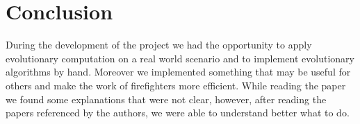\section{Conclusion}
During the development of the project we had the opportunity to apply evolutionary computation on a real world scenario 
and to implement evolutionary algorithms by hand. Moreover we implemented something that may be useful for others and make the work
of firefighters more efficient.
While reading the paper we found some explanations that were not clear, however, after reading the papers
referenced by the authors, we were able to understand better what to do.